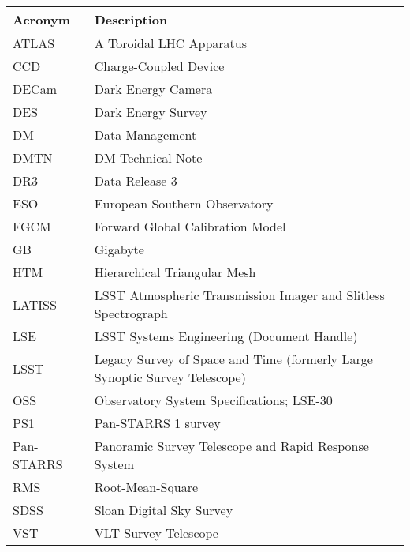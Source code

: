 \addtocounter{table}{-1}
\begin{longtable}{p{}p{}}\hline
\textbf{Acronym} & \textbf{Description}  \\\hline

ATLAS & A Toroidal LHC Apparatus \\\hline
CCD & Charge-Coupled Device \\\hline
DECam & Dark Energy Camera \\\hline
DES & Dark Energy Survey \\\hline
DM & Data Management \\\hline
DMTN & DM Technical Note \\\hline
DR3 & Data Release 3 \\\hline
ESO & European Southern Observatory \\\hline
FGCM & Forward Global Calibration Model \\\hline
GB & Gigabyte \\\hline
HTM & Hierarchical Triangular Mesh \\\hline
LATISS & LSST Atmospheric Transmission Imager and Slitless Spectrograph \\\hline
LSE & LSST Systems Engineering (Document Handle) \\\hline
LSST & Legacy Survey of Space and Time (formerly Large Synoptic Survey Telescope) \\\hline
OSS & Observatory System Specifications; LSE-30 \\\hline
PS1 & Pan-STARRS 1 survey \\\hline
Pan-STARRS & Panoramic Survey Telescope and Rapid Response System \\\hline
RMS & Root-Mean-Square \\\hline
SDSS & Sloan Digital Sky Survey \\\hline
VST & VLT Survey Telescope \\\hline
\end{longtable}
